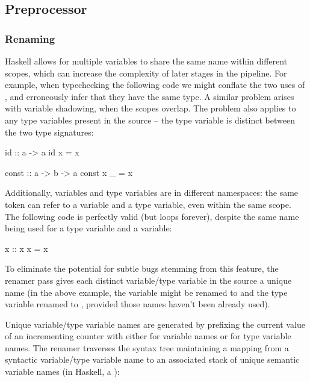\documentclass[dissertation.tex]{subfiles}
\begin{document}
{{    }
    \subsection{Preprocessor}
    {
        \subsubsection{Renaming}
        {

            Haskell allows for multiple variables to share the same name within different scopes, which can increase the
            complexity of later stages in the pipeline. For example, when typechecking the following code we might
            conflate the two uses of , and erroneously infer that they have the same type. A similar problem
            arises with variable shadowing, when the scopes overlap. The problem also applies to any type variables
            present in the source -- the type variable  is distinct between the two type signatures:

            \begin{haskellfigure}
            id :: a -> a
            id x = x

            const :: a -> b -> a
            const x _ = x
            \end{haskellfigure}

            Additionally, variables and type variables are in different namespaces: the same token can refer to a
            variable and a type variable, even within the same scope. The following code is perfectly valid (but loops
            forever), despite the same name being used for a type variable and a variable:

            \begin{haskellfigure}
            x :: x
            x = x
            \end{haskellfigure}

            To eliminate the potential for subtle bugs stemming from this feature, the renamer pass gives each distinct
            variable/type variable in the source a unique name (in the above example, the variable  might be
            renamed to  and the type variable renamed to , provided those names haven't been
            already used).
            
            Unique variable/type variable names are generated by prefixing the current value of an incrementing counter
            with either  for variable names or  for type variable names. The renamer traverses
            the syntax tree maintaining a mapping from a syntactic variable/type variable name to an associated stack of
            unique semantic variable names (in Haskell, a ):

}}}
\end{document}
